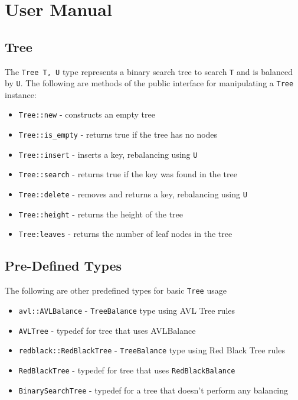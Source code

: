 \documentclass[11pt, letterpaper]{article}
\begin{document}
\pagebreak

\section{User Manual}

\subsection{Tree}
The  \texttt{Tree T, U} type represents a binary search tree to search  \texttt{T} and is balanced by \texttt{U}.
The following are methods of the public interface for manipulating a \texttt{Tree} instance:
\begin{itemize}
    \item \texttt{Tree::new} - constructs an empty tree
    \item \texttt{Tree::is_empty} - returns true if the tree has no nodes
    \item \texttt{Tree::insert} - inserts a key, rebalancing using  \texttt{U}
    \item \texttt{Tree::search} - returns true if the key was found in the tree
    \item \texttt{Tree::delete} - removes and returns a key, rebalancing using  \texttt{U}
    \item \texttt{Tree::height} - returns the height of the tree
    \item \texttt{Tree:leaves} - returns the number of leaf nodes in the tree   
\end{itemize}

\subsection{Pre-Defined Types}
The following are other predefined types for basic \texttt{Tree} usage
\begin{itemize}
    \item \texttt{avl::AVLBalance} - \texttt{TreeBalance} type using AVL Tree rules
    \item \texttt{AVLTree} - typedef for tree that uses AVLBalance
    \item \texttt{redblack::RedBlackTree} - \texttt{TreeBalance} type using Red Black Tree rules
    \item \texttt{RedBlackTree} - typedef for tree that uses  \texttt{RedBlackBalance}
    \item \texttt{BinarySearchTree} - typedef for a tree that doesn't perform any balancing
\end{itemize}
\end{document}
